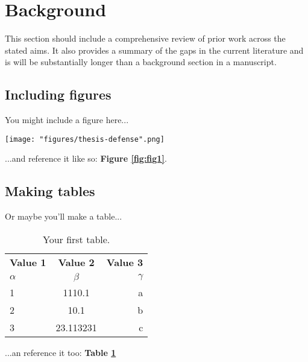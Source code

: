 \center

\section{Background}

\raggedright

This section should include a comprehensive review of prior work across the stated aims. It also provides a summary of the gaps in the current literature and is will be substantially longer than a background section in a manuscript.

\subsection{Including figures}

You might include a figure here...

\begin{figure*}
  \centering
  \texttt{[image: "figures/thesis-defense".png]}
  \caption{\textbf{The best thesis defense is a good thesis offense.} A conceptual illustration of the celebrated thesis \textit{offense}, an ambitious but often effective tactical maneuver.}
  \label{fig:fig1}
\end{figure*}

...and reference it like so: \textbf{Figure \ref{fig:fig1}}.

\subsection{Making tables}

Or maybe you'll make a table...

\begin{table}[h!]
  \begin{center}
    \caption{Your first table.}
    \label{tab:table1}
    \begin{tabular}{l|c|r} %
      \textbf{Value 1} & \textbf{Value 2} & \textbf{Value 3}\\
      $\alpha$ & $\beta$ & $\gamma$ \\
      \hline
      1 & 1110.1 & a\\
      2 & 10.1 & b\\
      3 & 23.113231 & c\\
    \end{tabular}
    \label{table:table1}
  \end{center}
\end{table}

...an reference it too: \textbf{Table \ref{table:table1}}